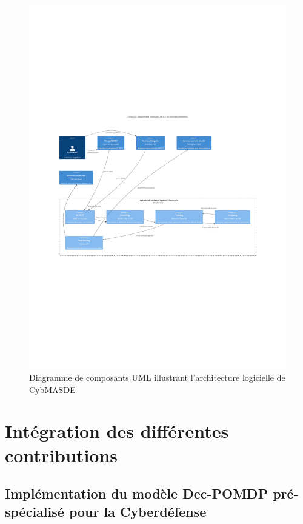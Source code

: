 \begin{figure}
  \centering
  \includegraphics[trim={2.25cm 9cm 2.25cm 10cm},clip,width=\textwidth]{figures/CybMASDE_internal_component_diagram.pdf}
  \caption{Diagramme de composants UML illustrant l'architecture logicielle de CybMASDE}
  \label{fig:cybmasde_uml}
\end{figure}

\section{Intégration des différentes contributions}

\subsection{Implémentation du modèle Dec-POMDP pré-spécialisé pour la Cyberdéfense}

